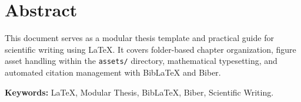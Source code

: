 \section*{Abstract}
This document serves as a modular thesis template and practical guide for scientific writing using LaTeX. It covers folder-based chapter organization, figure asset handling within the \texttt{assets/} directory, mathematical typesetting, and automated citation management with BibLaTeX and Biber.

\vspace{0.5em}
\noindent\textbf{Keywords:} LaTeX, Modular Thesis, BibLaTeX, Biber, Scientific Writing.
